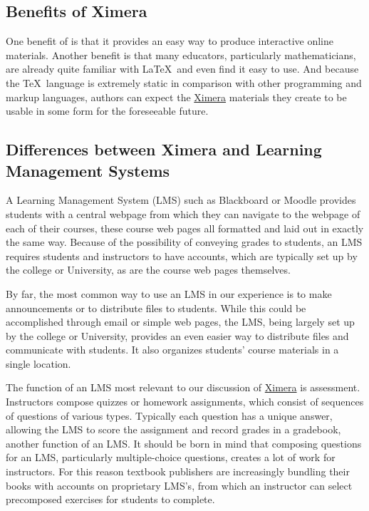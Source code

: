 \documentclass{ximera}
\begin{document}
\subsection{Benefits of Ximera}
One benefit of 
is that it provides an easy way to produce interactive online materials.
Another benefit is that many educators, particularly mathematicians,
are already quite familiar with \LaTeX\ and
even find it easy to use.
And because the \TeX\ language is extremely static in comparison with
other programming and markup languages, authors can expect
the \href{http://ximera.osu.edu}{\sf Ximera}
materials they create to be usable in some
form for the foreseeable future.

\subsection{Differences between Ximera and Learning Management Systems}
A Learning Management System
(LMS) such as Blackboard or Moodle
provides students with a central webpage from
which they can navigate to the webpage of
each of their courses, these course web pages
all formatted and laid out in exactly the same way.
Because of the possibility of conveying grades
to students, an LMS requires students
and instructors to have accounts,
which are typically set up by
the college or University, as are the course
web pages themselves.

By far, the most common way to use an LMS in our
experience is to make announcements or to distribute
files to students.  While this could be accomplished through email
or simple web pages, the LMS, being
largely set up by the college or University, provides
an even easier way to distribute files and communicate with students.
It also organizes students' course materials in a single location.

The function of an LMS most relevant to our discussion
of \href{http://ximera.osu.edu}{\sf Ximera} is assessment.
Instructors compose quizzes or homework assignments,
which consist of sequences of questions of various types.
Typically each question has a unique answer, allowing
the LMS to score the assignment and record grades in a
gradebook, another function of an LMS.
It should be born in mind that composing questions for
an LMS, particularly multiple-choice questions, creates a lot of work
for instructors. For this reason textbook publishers
are increasingly bundling their books with accounts
on proprietary LMS's, from which an
instructor can select precomposed exercises for students
to complete.
\end{document}
